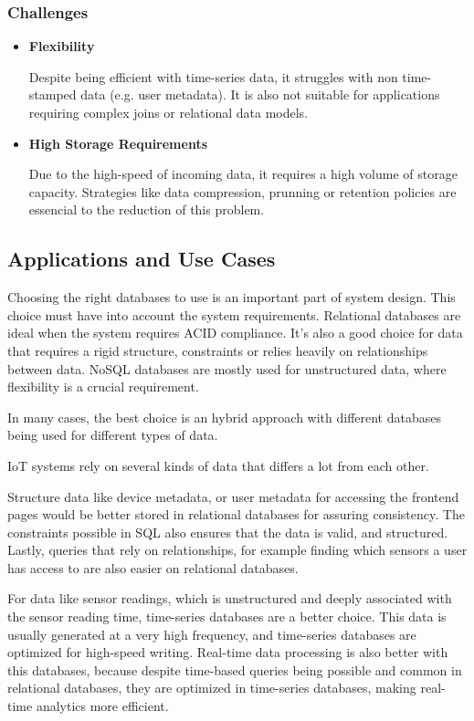 \subsubsection{Challenges}

\begin{itemize}

	\item \textbf{Flexibility}

	      Despite being efficient with time-series data, it struggles with non
	      time-stamped data (e.g. user metadata). It is also not suitable for applications requiring
	      complex joins or relational data models.

	\item \textbf{High Storage Requirements}

	      Due to the high-speed of incoming data, it requires a high volume of storage
	      capacity. Strategies like data compression, prunning or retention policies
	      are essencial to the reduction of this problem.

\end{itemize}
\subsection{Applications and Use Cases}
Choosing the right databases to use is an important part of system design. This
choice must have into account the system requirements. Relational databases are
ideal when the system requires ACID compliance. It's also a good choice for
data that requires a rigid structure, constraints or relies heavily on
relationships between data. NoSQL databases are mostly used for unstructured
data, where flexibility is a crucial requirement.

In many cases, the best choice is an hybrid approach with different databases
being used for different types of data.

IoT systems rely on several kinds of data that differs a lot from each other.

Structure data like device metadata, or user metadata for accessing the
frontend pages would be better stored in relational databases for assuring
consistency. The constraints possible in SQL also ensures that the data is valid,
and structured. Lastly, queries that rely on relationships, for example finding
which sensors a user has access to are also easier on relational databases.

For data like sensor readings, which is unstructured and deeply associated with
the sensor reading time, time-series databases are a better choice. This data
is usually generated at a very high frequency, and time-series databases are
optimized for high-speed writing. Real-time data processing is also better with
this databases, because despite time-based queries being possible and common in
relational databases, they are optimized in time-series databases, making
real-time analytics more efficient.

